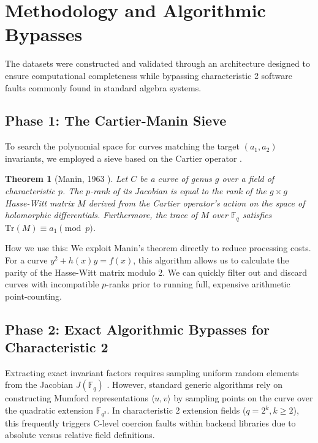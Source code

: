 \documentclass[letterpaper, 11pt]{article}
\newtheorem{theorem}{Theorem}[section]
\begin{document}
\section{Methodology and Algorithmic Bypasses}
The datasets were constructed and validated through an architecture designed to ensure computational completeness while bypassing characteristic 2 software faults commonly found in standard algebra systems.

\subsection{Phase 1: The Cartier-Manin Sieve}
To search the polynomial space for curves matching the target $(a_1, a_2)$ invariants, we employed a sieve based on the Cartier operator \cite{Cartier1958}. 

\begin{theorem}[Manin, 1963 \cite{Manin1963}]
Let $C$ be a curve of genus $g$ over a field of characteristic $p$. The $p$-rank of its Jacobian is equal to the rank of the $g \times g$ Hasse-Witt matrix $M$ derived from the Cartier operator's action on the space of holomorphic differentials. Furthermore, the trace of $M$ over $\mathbb{F}_q$ satisfies $\text{Tr}(M) \equiv a_1 \pmod p$.
\end{theorem}

How we use this: We exploit Manin's theorem directly to reduce processing costs. For a curve $y^2 + h(x)y = f(x)$, this algorithm allows us to calculate the parity of the Hasse-Witt matrix modulo 2. We can quickly filter out and discard curves with incompatible $p$-ranks prior to running full, expensive arithmetic point-counting.

\subsection{Phase 2: Exact Algorithmic Bypasses for Characteristic 2}
Extracting exact invariant factors requires sampling uniform random elements from the Jacobian $J(\mathbb{F}_q)$ \cite{Sutherland2007}. However, standard generic algorithms rely on constructing Mumford representations $\langle u, v \rangle$ \cite{Cantor1987} by sampling points on the curve over the quadratic extension $\mathbb{F}_{q^2}$. In characteristic 2 extension fields ($q = 2^k, k \ge 2$), this frequently triggers C-level coercion faults within backend libraries due to absolute versus relative field definitions.
\end{document}
